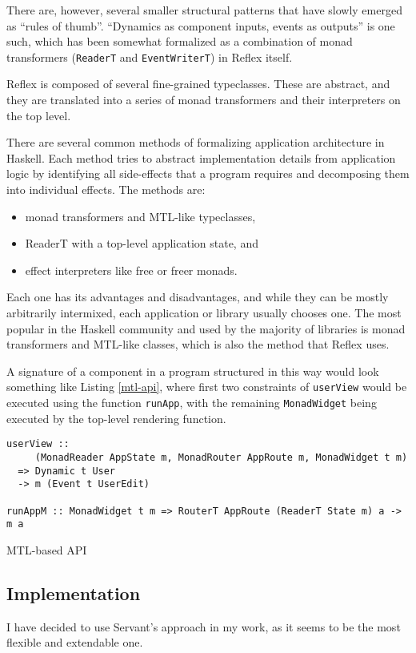 \documentclass[english,odsaz]{fitthesis}
\begin{document}
There are, however, several smaller structural patterns that have slowly emerged
as ``rules of thumb''. ``Dynamics as component inputs, events as outputs'' is one
such, which has been somewhat formalized as a combination of monad transformers
(\texttt{ReaderT} and \texttt{EventWriterT}) in Reflex itself.

Reflex is composed of several fine-grained typeclasses. These are abstract, and
they are translated into a series of monad transformers and their interpreters
on the top level.

There are several common methods of formalizing application architecture in
Haskell. Each method tries to abstract implementation details from application
logic by identifying all side-effects that a program requires and decomposing
them into individual effects. The methods are:

\begin{itemize}
\item monad transformers and MTL-like typeclasses,
\item ReaderT with a top-level application state, and
\item effect interpreters like free or freer monads.
\end{itemize}

Each one has its advantages and disadvantages, and while they can be mostly
arbitrarily intermixed, each application or library usually chooses one. The
most popular in the Haskell community and used by the majority of libraries is
monad transformers and MTL-like classes, which is also the method that Reflex
uses.

A signature of a component in a program structured in this way would look
something like Listing \ref{mtl-api}, where first two constraints of \texttt{userView}
would be executed using the function \texttt{runApp}, with the remaining \texttt{MonadWidget}
being executed by the top-level rendering function.

\begin{listing}[htbp]
\begin{verbatim}
userView ::
     (MonadReader AppState m, MonadRouter AppRoute m, MonadWidget t m)
  => Dynamic t User
  -> m (Event t UserEdit)

runAppM :: MonadWidget t m => RouterT AppRoute (ReaderT State m) a -> m a
\end{verbatim}
\caption{MTL-based API \label{mtl-api}}
\end{listing}

\subsection{Implementation}
\label{sec:org23c98aa}
I have decided to use Servant's approach in my work, as it seems to be the most
flexible and extendable one.
\end{document}
